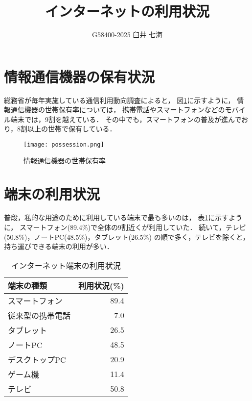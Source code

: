 \documentclass[a4paper,11pt,dvipdfmx]{ujarticle}
\title{インターネットの利用状況}
\author{G58400-2025 臼井 七海}
\begin{document}
\maketitle

\section{情報通信機器の保有状況}

総務省が毎年実施している通信利用動向調査\cite{soumu}によると，
図\ref{fig:保有率}に示すように，
情報通信機器の世帯保有率については，
携帯電話やスマートフォンなどのモバイル端末では，9割を越えている．
その中でも，スマートフォンの普及が進んでおり，8割以上の世帯で保有している．

\begin{figure}[htbp]
    \centering
    \texttt{[image: possession.png]}
    \caption{情報通信機器の世帯保有率}\label{fig:保有率}
\end{figure}

\section{端末の利用状況}

普段，私的な用途のために利用している端末で最も多いのは，
表\ref{tbl:利用状況}に示すように，
スマートフォン(89.4\%)で全体の9割近くが利用していた．
続いて，テレビ(50.8\%)，ノートPC(48.5\%)，タブレット(26.5\%)
の順で多く，テレビを除くと，持ち運びできる端末の利用が多い\cite{corona}．

\begin{table}[htbp]
    \centering
    \caption{インターネット端末の利用状況}
    \label{tbl:利用状況}

    \begin{tabular}{|l|r|}\hline
        端末の種類 & 利用状況(\%) \\
        \hline
        スマートフォン & 89.4 \\
        \hline
        従来型の携帯電話 & 7.0 \\
        \hline
        タブレット & 26.5 \\
        \hline
        ノートPC & 48.5 \\
        \hline
        デスクトップPC & 20.9 \\
        \hline
        ゲーム機 & 11.4 \\
        \hline 
        テレビ & 50.8 \\
        \hline
    \end{tabular}
\end{table}
\end{document}
